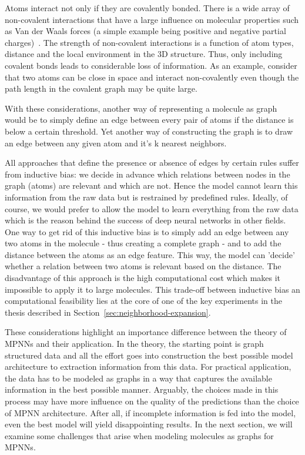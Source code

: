 Atoms interact not only if they are covalently bonded. There is a wide array of non-covalent interactions that have a large influence on molecular properties such as Van der Waals forces (a simple example being positive and negative partial charges)~\cite{Organic-chemistry}. The strength of non-covalent interactions is a function of atom types, distance and the local environment in the 3D structure. Thus, only including covalent bonds leads to considerable loss of information. As an example, consider that two atoms can be close in space and interact non-covalently even though the path length in the covalent graph may be quite large.

With these considerations, another way of representing a molecule as graph would be to simply define an edge between every pair of atoms if the distance is below a certain threshold. Yet another way of constructing the graph is to draw an edge between any given atom and it's k nearest neighbors.

All approaches that define the presence or absence of edges by certain rules suffer from inductive bias: we decide in advance which relations between nodes in the graph (atoms) are relevant and which are not. Hence the model cannot learn this information from the raw data but is restrained by predefined rules. Ideally, of course, we would prefer to allow the model to learn everything from the raw data which is the reason behind the success of deep neural networks in other fields. One way to get rid of this inductive bias is to simply add an edge between any two atoms in the molecule - thus creating a complete graph - and to add the distance between the atoms as an edge feature. This way, the model can 'decide' whether a relation between two atoms is relevant based on the distance. The disadvantage of this approach is the high computational cost which makes it impossible to apply it to large molecules. This trade-off between inductive bias an computational feasibility lies at the core of one of the key experiments in the thesis described in Section~\ref{sec:neighborhood-expansion}.

%

These considerations highlight an importance difference between the theory of MPNNs and their application. In the theory, the starting point is graph structured data and all the effort goes into construction the best possible model architecture to extraction information from this data. For practical application, the data has to be modeled as graphs in a way that captures the available information in the best possible manner. Arguably, the choices made in this process may have more influence on the quality of the predictions than the choice of MPNN architecture. After all, if incomplete information is fed into the model, even the best model will yield disappointing results. In the next section, we will examine some challenges that arise when modeling molecules as graphs for MPNNs.


